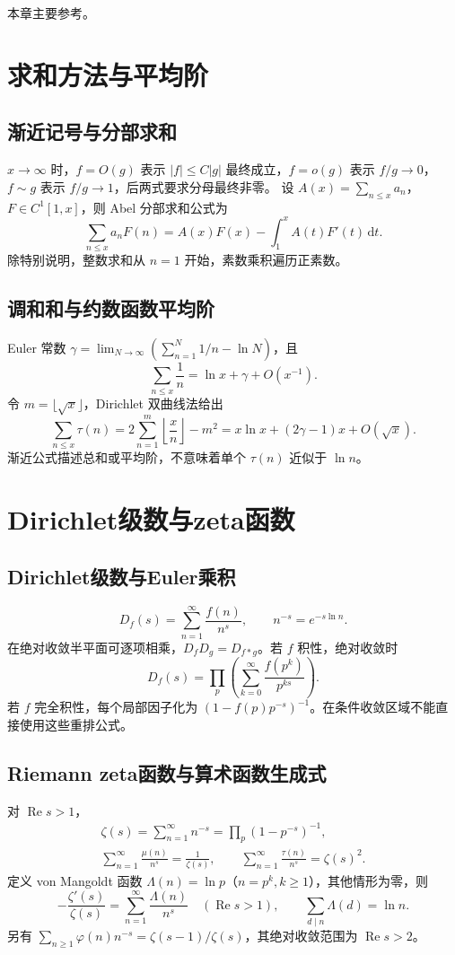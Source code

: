 \documentclass[../main.tex]{subfiles}
\begin{document}
本章主要参考\cite{davenport,dlmf}。

\section{求和方法与平均阶}
\subsection{渐近记号与分部求和}
$x\to\infty$ 时，$f=O(g)$ 表示 $|f|\le C|g|$ 最终成立，$f=o(g)$ 表示 $f/g\to0$，$f\sim g$ 表示 $f/g\to1$，后两式要求分母最终非零。
设 $A(x)=\sum_{n\le x}a_n$，$F\in C^1[1,x]$，则 Abel 分部求和公式为
\[
\sum_{n\le x}a_nF(n)=A(x)F(x)-\int_1^xA(t)F'(t)\,\mathrm dt.
\]
除特别说明，整数求和从 $n=1$ 开始，素数乘积遍历正素数。
\subsection{调和和与约数函数平均阶}
Euler 常数 $\gamma=\lim_{N\to\infty}(\sum_{n=1}^N1/n-\ln N)$，且
\[
\sum_{n\le x}\frac1n=\ln x+\gamma+O(x^{-1}).
\]
令 $m=\lfloor\sqrt x\rfloor$，Dirichlet 双曲线法给出
\[
\sum_{n\le x}\tau(n)=2\sum_{n=1}^m\left\lfloor\frac xn\right\rfloor-m^2
=x\ln x+(2\gamma-1)x+O(\sqrt x).
\]
渐近公式描述总和或平均阶，不意味着单个 $\tau(n)$ 近似于 $\ln n$。
\section{Dirichlet级数与zeta函数}
\subsection{Dirichlet级数与Euler乘积}
\[
D_f(s)=\sum_{n=1}^\infty\frac{f(n)}{n^s},\qquad n^{-s}=e^{-s\ln n}.
\]
在绝对收敛半平面可逐项相乘，$D_fD_g=D_{f*g}$。若 $f$ 积性，绝对收敛时
\[
D_f(s)=\prod_p\left(\sum_{k=0}^\infty\frac{f(p^k)}{p^{ks}}\right).
\]
若 $f$ 完全积性，每个局部因子化为 $(1-f(p)p^{-s})^{-1}$。在条件收敛区域不能直接使用这些重排公式。
\subsection{Riemann zeta函数与算术函数生成式}
对 $\operatorname{Re}s>1$，
\begin{gather*}
\zeta(s)=\sum_{n=1}^\infty n^{-s}=\prod_p(1-p^{-s})^{-1},\\
\sum_{n=1}^\infty\frac{\mu(n)}{n^s}=\frac1{\zeta(s)},\qquad
\sum_{n=1}^\infty\frac{\tau(n)}{n^s}=\zeta(s)^2.
\end{gather*}
定义 von Mangoldt 函数 $\Lambda(n)=\ln p$（$n=p^k,k\ge1$），其他情形为零，则
\[
-\frac{\zeta'(s)}{\zeta(s)}=\sum_{n=1}^\infty\frac{\Lambda(n)}{n^s}
\quad(\operatorname{Re}s>1),\qquad \sum_{d\mid n}\Lambda(d)=\ln n.
\]
另有 $\sum_{n\ge1}\varphi(n)n^{-s}=\zeta(s-1)/\zeta(s)$，其绝对收敛范围为 $\operatorname{Re}s>2$。
\end{document}

